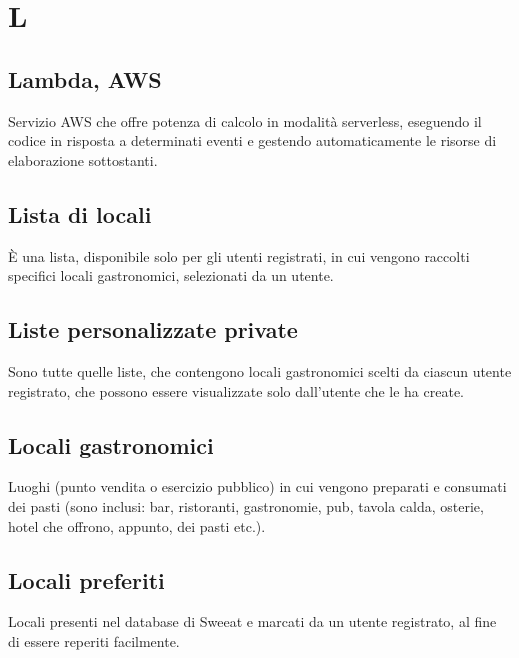 \section{L}

\subsection{Lambda, AWS}
Servizio AWS che offre potenza di calcolo in modalità serverless, eseguendo il codice in risposta a determinati eventi e gestendo automaticamente le risorse di elaborazione sottostanti. 

\subsection{Lista di locali} È una lista, disponibile solo per gli utenti registrati, in cui vengono raccolti specifici locali gastronomici, selezionati da un utente.

\subsection{Liste personalizzate private} Sono tutte quelle liste, che contengono locali gastronomici scelti da ciascun utente registrato, che possono essere visualizzate solo dall’utente che le ha create.

\subsection{Locali gastronomici} Luoghi (punto vendita o esercizio pubblico) in cui vengono preparati e consumati dei pasti (sono inclusi: bar, ristoranti, gastronomie, pub, tavola calda, osterie, hotel che offrono, appunto, dei pasti etc.).

\subsection{Locali preferiti} Locali presenti nel database di Sweeat e marcati da un utente registrato, al fine di essere reperiti facilmente.

\clearpage